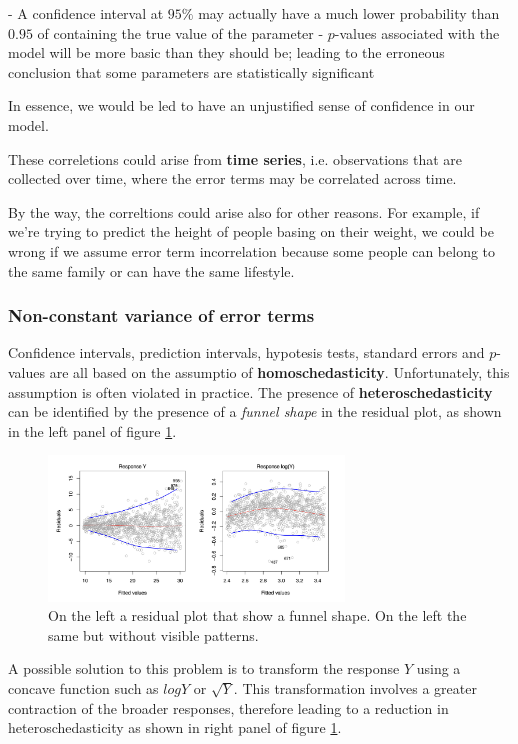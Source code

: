 - A confidence interval at $95\%$ may actually have a much lower probability than $0.95$ of containing the true value of the parameter
- $p$-values associated with the model will be more basic than they should be; leading to the erroneous conclusion that some parameters are statistically significant

In essence, we would be led to have an unjustified sense of confidence in our model.

These correletions could arise from \textbf{time series}, i.e. observations that are collected over time, where the error terms may be correlated across time.

By the way, the correltions could arise also for other reasons. For example, if we're trying to predict the height of people basing on their weight, we could be wrong if we assume error term incorrelation because some people can belong to the same family or can have the same lifestyle.
\subsubsection*{Non-constant variance of error terms}
Confidence intervals, prediction intervals, hypotesis tests, standard errors and $p$-values are all based on the assumptio of \textbf{homoschedasticity}.
Unfortunately, this assumption is often violated in practice. The presence of \textbf{heteroschedasticity} can be identified by the presence of a \textit{funnel shape} in the residual plot, as shown in the left panel of figure \ref{fig:eteroschedasticity_example}.
\begin{figure}
    \centering
    \includegraphics[width=0.7\textwidth]{./figures/chapter_3/eteroschedasticity_example.png}
    \caption{On the left a residual plot that show a funnel shape. On the left the same but without visible patterns.}
    \label{fig:eteroschedasticity_example}
\end{figure}

A possible solution to this problem is to transform the response $Y$ using a concave function such as $log Y$ or $\sqrt{Y}$. This transformation involves a greater contraction of the broader responses, therefore leading to a reduction in heteroschedasticity as shown in right panel of figure \ref{fig:eteroschedasticity_example}.
